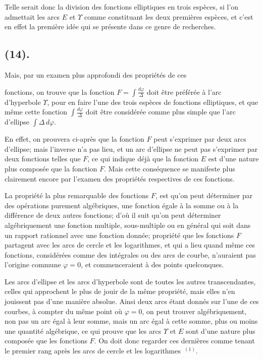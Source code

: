 \documentclass{article}
\begin{document}
Telle serait donc la division des fonctions elliptiques en trois espèces, si l'on admettait les arcs $E$ et $\Upsilon$ comme constituant les deux premières espèces, et c'est en effet la première idée qui se présente dans ce genre de recherches.

\subsection*{(14).}

Mais, par un examen plus approfondi des propriétés de ces

fonctions, on trouve que la fonction $F=\displaystyle\int\frac{d\varphi}{\Delta}$ doit être préférée à l'arc d'hyperbole $\Upsilon$, pour en faire l'une des trois espèces de fonctions elliptiques, et que même cette fonction $\displaystyle\int\frac{d\varphi}{\Delta}$ doit être considérée comme plus simple que l'arc d'ellipse $\displaystyle\int\Delta\,d\varphi$.

En effet, on prouvera ci-après que la fonction $F$ peut s'exprimer par deux arcs d'ellipse; mais l'inverse n'a pas lieu, et un arc d'ellipse ne peut pas s'exprimer par deux fonctions telles que $F$, ce qui indique déjà que la fonction $E$ est d'une nature plus composée que la fonction $F$. Mais cette conséquence se manifeste plus clairement encore par l'examen des propriétés respectives de ces fonctions.

La propriété la plus remarquable des fonctions $F$, est qu'on peut déterminer par des opérations purement algébriques, une fonction égale à la somme ou à la différence de deux autres fonctions; d'où il suit qu'on peut déterminer algébriquement une fonction multiple, sous-multiple ou en général qui soit dans un rapport rationnel avec une fonction donnée; propriété que les fonctions $F$ partagent avec les arcs de cercle et les logarithmes, et qui a lieu quand même ces fonctions, considérées comme des intégrales ou des arcs de courbe, n'auraient pas l'origine commune $\varphi=0$, et commenceraient à des points quelconques.

Les arcs d'ellipse et les arcs d'hyperbole sont de toutes les autres transcendantes, celles qui approchent le plus de jouir de la même propriété, mais elles n'en jouissent pas d'une manière absolue. Ainsi deux arcs étant donnés sur l'une de ces courbes, à compter du même point où $\varphi=0$, on peut trouver algébriquement, non pas un arc égal à leur somme, mais un arc égal à cette somme, plus ou moins une quantité algébrique, ce qui prouve que les arcs $\Upsilon$ et $E$ sont d'une nature plus composée que les fonctions $F$. On doit donc regarder ces dernières comme tenant le premier rang après les arcs de cercle et les logarithmes~${}^{(1)}$.
\end{document}
